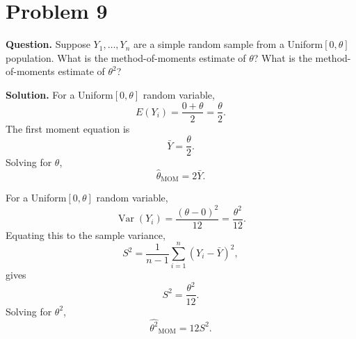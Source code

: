 \documentclass[11pt]{article}
\begin{document}
\section*{Problem 9}

\textbf{Question.} Suppose $Y_1,\ldots,Y_n$ are a simple random sample from a Uniform$[0,\theta]$ population. What is the method-of-moments estimate of $\theta$? What is the method-of-moments estimate of $\theta^2$?

\textbf{Solution.} For a Uniform$[0,\theta]$ random variable,
\[
E(Y_i)=\frac{0+\theta}{2}=\frac{\theta}{2}.
\]
The first moment equation is
\[
\bar Y=\frac{\theta}{2}.
\]
Solving for $\theta$,
\[
\boxed{\hat\theta_{\text{MOM}}=2\bar Y}.
\]

For a Uniform$[0,\theta]$ random variable,
\[
\operatorname{Var}(Y_i)=\frac{(\theta-0)^2}{12}=\frac{\theta^2}{12}.
\]
Equating this to the sample variance,
\[
S^2=\frac{1}{n-1}\sum_{i=1}^{n}(Y_i-\bar Y)^2,
\]
gives
\[
S^2=\frac{\theta^2}{12}.
\]
Solving for $\theta^2$,
\[
\boxed{\widehat{\theta^2}_{\text{MOM}}=12S^2}.
\]

\newpage
\end{document}
